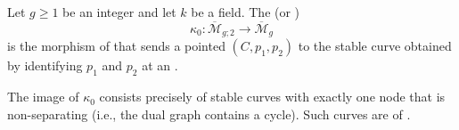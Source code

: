 \begin{definition} \label{definition:clutching_morphism_of_moduli_for_a_single_pointed_stable_curve_at_two_points_over_a_field}
    Let $g \geq 1$ be an integer and let $k$ be a field. The  (or )
    $$\kappa_0\colon \overline{\mathcal{M}}_{g; 2} \to \overline{\mathcal{M}}_g$$
    is the morphism of  that sends a pointed  $(C, p_1, p_2)$ to the stable curve obtained by identifying $p_1$ and $p_2$ at an .

    The image of $\kappa_0$ consists precisely of stable curves with exactly one node that is non-separating (i.e., the dual graph contains a cycle). Such curves are of .
\end{definition}
